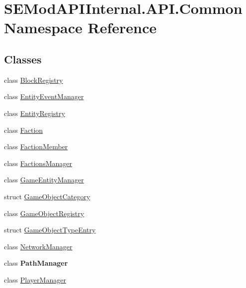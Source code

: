 \hypertarget{namespace_s_e_mod_a_p_i_internal_1_1_a_p_i_1_1_common}{}\section{S\+E\+Mod\+A\+P\+I\+Internal.\+A\+P\+I.\+Common Namespace Reference}
\label{namespace_s_e_mod_a_p_i_internal_1_1_a_p_i_1_1_common}
\subsection*{Classes}
\begin{DoxyCompactItemize}
\item 
class \hyperlink{class_s_e_mod_a_p_i_internal_1_1_a_p_i_1_1_common_1_1_block_registry}{Block\+Registry}
\item 
class \hyperlink{class_s_e_mod_a_p_i_internal_1_1_a_p_i_1_1_common_1_1_entity_event_manager}{Entity\+Event\+Manager}
\item 
class \hyperlink{class_s_e_mod_a_p_i_internal_1_1_a_p_i_1_1_common_1_1_entity_registry}{Entity\+Registry}
\item 
class \hyperlink{class_s_e_mod_a_p_i_internal_1_1_a_p_i_1_1_common_1_1_faction}{Faction}
\item 
class \hyperlink{class_s_e_mod_a_p_i_internal_1_1_a_p_i_1_1_common_1_1_faction_member}{Faction\+Member}
\item 
class \hyperlink{class_s_e_mod_a_p_i_internal_1_1_a_p_i_1_1_common_1_1_factions_manager}{Factions\+Manager}
\item 
class \hyperlink{class_s_e_mod_a_p_i_internal_1_1_a_p_i_1_1_common_1_1_game_entity_manager}{Game\+Entity\+Manager}
\item 
struct \hyperlink{struct_s_e_mod_a_p_i_internal_1_1_a_p_i_1_1_common_1_1_game_object_category}{Game\+Object\+Category}
\item 
class \hyperlink{class_s_e_mod_a_p_i_internal_1_1_a_p_i_1_1_common_1_1_game_object_registry}{Game\+Object\+Registry}
\item 
struct \hyperlink{struct_s_e_mod_a_p_i_internal_1_1_a_p_i_1_1_common_1_1_game_object_type_entry}{Game\+Object\+Type\+Entry}
\item 
class \hyperlink{class_s_e_mod_a_p_i_internal_1_1_a_p_i_1_1_common_1_1_network_manager}{Network\+Manager}
\item 
class {\bfseries Path\+Manager}
\item 
class \hyperlink{class_s_e_mod_a_p_i_internal_1_1_a_p_i_1_1_common_1_1_player_manager}{Player\+Manager}

\end{DoxyCompactItemize}
